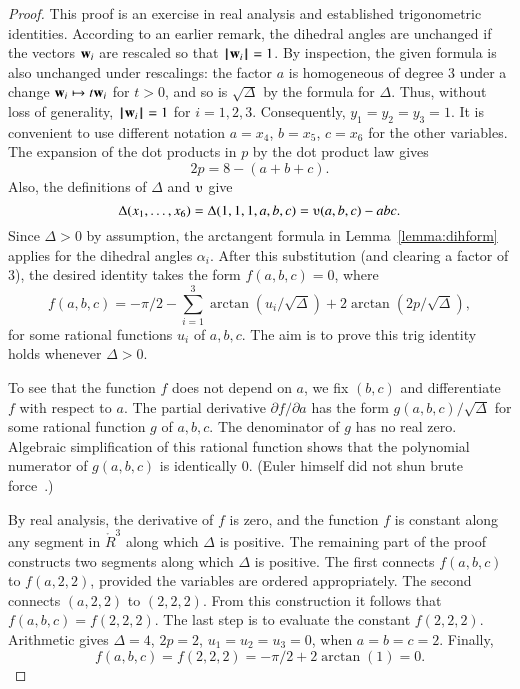 \begin{proof}
  This proof is an exercise in real analysis
  and established trigonometric identities.  According to an earlier
  remark, the dihedral angles are unchanged if the
  vectors ${\mathbf w}_i$ are rescaled so that ${{\hskip0.1em|\hskip-0.15em|\hskip0.1em}{\mathbf w}_i{\hskip0.1em|\hskip-0.15em|\hskip0.1em}}=1$.  By
  inspection, the given formula is also unchanged under rescalings:
  the factor $a$ is homogeneous of degree $3$ under a change ${\mathbf w}_i
  \mapsto t {\mathbf w}_i$ for $t>0$, and so is $\sqrt{\Delta}$ by the formula
  for $\Delta$.  Thus, without loss of generality, ${{\hskip0.1em|\hskip-0.15em|\hskip0.1em}{\mathbf w}_i{\hskip0.1em|\hskip-0.15em|\hskip0.1em}}=1$ for $i=1,2,3$.  Consequently, $y_1=y_2=y_3=1$.  It is convenient to
  use different notation $a=x_4$, $b=x_5$, $c=x_6$ for the other
  variables. The expansion of the dot products in $p$ by the dot
  product law gives
\[ 2 p = 8 - (a+b+c).\] 
Also, the definitions of $\Delta$ and $\ups$ give
\[ \Delta(x_1,\ldots,x_6) = \Delta(1,1,1,a,b,c) =
\ups(a,b,c) - a b c.\] 
Since $\Delta>0$ by assumption, the arctangent formula
in Lemma~\ref{lemma:dihform} 
applies for the dihedral angles $\alpha_i$.  After
this substitution (and clearing a factor of $3$),  %
the desired identity takes the form $f(a,b,c)=0$, where
\[ 
f(a,b,c)= -\pi/2 - \sum_{i=1}^3\arctan(u_i/\sqrt{\Delta}) +
2\arctan(2 p/\sqrt{\Delta}),
\] 
for some rational functions $u_i$ of $a,b,c$.  The aim is to prove
this trig identity holds whenever $\Delta>0$.

To see that the function $f$ does not depend on $a$, 
we fix $(b,c)$ and differentiate $f$ with respect to $a$.  The partial
derivative $\partial f/\partial a$ has the form
$g(a,b,c)/\sqrt{\Delta}$ for some rational function $g$ of $a,b,c$.
The denominator of $g$ has no real zero.  Algebraic simplification of
this rational function shows that the polynomial numerator of
$g(a,b,c)$ is identically $0$.  (Euler himself did not shun brute
force~\cite{Euler}.)

By real analysis, the derivative of $f$ is zero, and the function $f$
is constant along any segment in $\ring{R}^3$ along which $\Delta$ is
positive.  The remaining part of the proof constructs two segments
along which $\Delta$ is positive.
The
first connects $f(a,b,c)$ to $f(a,2,2)$, provided the variables are
ordered appropriately.  The second connects $(a,2,2)$ to $(2,2,2)$.
From this construction it follows that $f(a,b,c)=f(2,2,2)$.  The last
step is to evaluate the constant $f(2,2,2)$.  Arithmetic gives
$\Delta=4$, $2p= 2$, $u_1=u_2=u_3 =0$, when $a=b=c=2$.  Finally,
\[ f(a,b,c)= f(2,2,2) = -\pi/2 + 2\arctan(1)
  =0.\] 



\end{proof}
